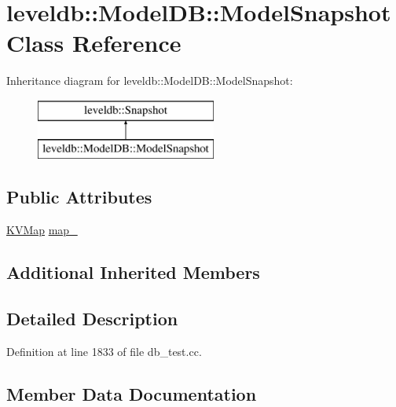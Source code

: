 \hypertarget{classleveldb_1_1_model_d_b_1_1_model_snapshot}{}\section{leveldb\+:\+:Model\+D\+B\+:\+:Model\+Snapshot Class Reference}
\label{classleveldb_1_1_model_d_b_1_1_model_snapshot}
Inheritance diagram for leveldb\+:\+:Model\+D\+B\+:\+:Model\+Snapshot\+:\begin{figure}[H]
\begin{center}
\leavevmode
\includegraphics[height=2.000000cm]{classleveldb_1_1_model_d_b_1_1_model_snapshot}
\end{center}
\end{figure}
\subsection*{Public Attributes}
\begin{DoxyCompactItemize}
\item 
\hyperlink{namespaceleveldb_aac1e50450147be263e08252c6700f7a7}{K\+V\+Map} \hyperlink{classleveldb_1_1_model_d_b_1_1_model_snapshot_a7ae02397c293072b78874d0c073a10c5}{map\+\_\+}
\end{DoxyCompactItemize}
\subsection*{Additional Inherited Members}


\subsection{Detailed Description}


Definition at line 1833 of file db\+\_\+test.\+cc.



\subsection{Member Data Documentation}
\hypertarget{classleveldb_1_1_model_d_b_1_1_model_snapshot_a7ae02397c293072b78874d0c073a10c5}{}
